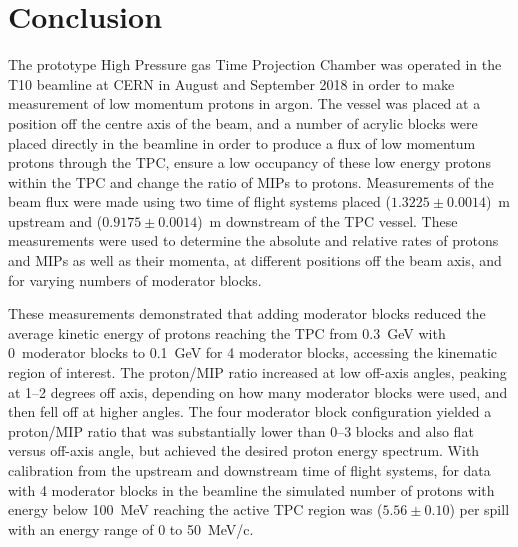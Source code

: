 \section{Conclusion}
\label{hptpcPaper:sec:Conclusion}

The prototype High Pressure gas Time Projection Chamber was operated in the T10 beamline at CERN in August and September 2018 in order to make measurement of low momentum protons in argon.
The vessel was placed at a position off the centre axis of the beam, and a number of acrylic blocks were placed directly in the beamline in order to produce a flux of low momentum protons through the TPC, ensure a low occupancy of these low energy protons within the TPC and change the ratio of MIPs to protons.
Measurements of the beam flux were made using two time of flight systems placed ($1.3225 \pm 0.0014$)~m upstream and ($0.9175 \pm 0.0014$)~m downstream of the TPC vessel.
These measurements were used to determine the absolute and relative rates of protons and MIPs as well as their momenta, at different positions off the beam axis, and for varying numbers of moderator blocks.

These measurements demonstrated that adding moderator blocks reduced the average kinetic energy of protons reaching the TPC from 0.3~GeV with 0~moderator blocks to 0.1~GeV for 4 moderator blocks, accessing the kinematic region of interest.
The proton/MIP ratio increased at low off-axis angles, peaking at 1–2 degrees off axis, depending on how many moderator blocks were used, and then fell off at higher angles.
The four moderator block configuration yielded a proton/MIP ratio that was  substantially lower than 0–3 blocks and also flat versus off-axis angle, but achieved the desired proton energy spectrum.
With calibration from the upstream and downstream time of flight systems, for data with 4 moderator blocks in the beamline the simulated number of protons with energy below 100~MeV reaching the active TPC region was ($5.56 \pm  0.10$) per spill with an energy range of 0 to 50~MeV/c.


